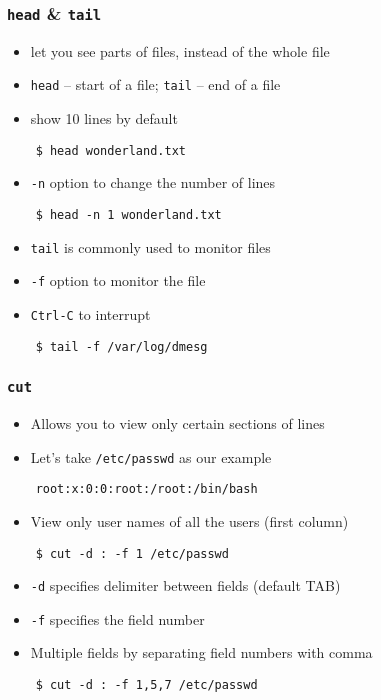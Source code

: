 \documentclass[12pt,compress]{beamer}
\begin{document}
\begin{frame}[fragile]
  \frametitle{\texttt{head} \& \texttt{tail}}
  \begin{itemize}
  \item let you see parts of files, instead of the whole file
  \item \texttt{head} -- start of a file; \texttt{tail} -- end of a
    file 
  \item show 10 lines by default
  \end{itemize}
  \begin{lstlisting}
    $ head wonderland.txt
  \end{lstlisting} %
  \begin{itemize}
  \item \texttt{-n} option to change the number of lines
  \end{itemize}
  \begin{lstlisting}
    $ head -n 1 wonderland.txt
  \end{lstlisting} %
  \begin{itemize}
  \item \texttt{tail} is commonly used to monitor files
  \item \texttt{-f} option to monitor the file
  \item \texttt{Ctrl-C} to interrupt
  \end{itemize}
  \begin{lstlisting}
    $ tail -f /var/log/dmesg
  \end{lstlisting} %
\end{frame}


\begin{frame}[fragile]
  \frametitle{\texttt{cut}}
  \begin{itemize}
  \item Allows you to view only certain sections of lines
  \item Let's take \texttt{/etc/passwd} as our example 
  \end{itemize}
  \begin{lstlisting}
    root:x:0:0:root:/root:/bin/bash
  \end{lstlisting}
  \begin{itemize}
  \item View only user names of all the users (first column)
  \end{itemize}
  \begin{lstlisting}
    $ cut -d : -f 1 /etc/passwd
  \end{lstlisting} %
  \begin{itemize}
  \item \texttt{-d} specifies delimiter between fields (default TAB)
  \item \texttt{-f} specifies the field number
  \item Multiple fields by separating field numbers with comma
  \end{itemize}
  \begin{lstlisting}
    $ cut -d : -f 1,5,7 /etc/passwd
  \end{lstlisting} %
\end{frame}
\end{document}
